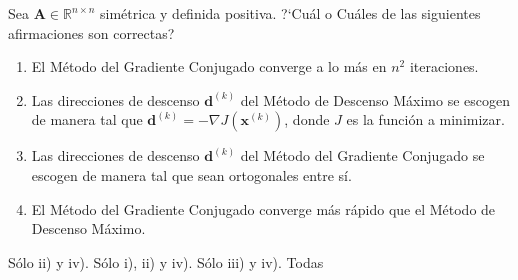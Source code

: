 \begin{pregunta}
\begin{cuerpo}
Sea $\boldsymbol{A}\in\mathbb{R}^{n\times n}$ sim\'etrica y definida positiva.
?`Cu\'al o Cu\'ales de las siguientes afirmaciones son correctas?
\begin{enumerate}
\item[i)] El M\'etodo del Gradiente Conjugado converge a lo m\'as en $n^2$ iteraciones.
\item[ii)] Las direcciones de descenso $\boldsymbol{d}^{(k)}$ del M\'etodo de Descenso M\'aximo se escogen de manera tal que  $\boldsymbol{d}^{(k)}=-\nabla J(\boldsymbol{x}^{(k)})$, donde $J$ es la funci\'on a minimizar.
\item[iii)] Las direcciones de descenso $\boldsymbol{d}^{(k)}$ del M\'etodo del Gradiente Conjugado se escogen de manera tal que  sean ortogonales entre s\'i.
\item[iv)] El M\'etodo del Gradiente Conjugado converge m\'as r\'apido que el M\'etodo de Descenso M\'aximo.
\end{enumerate}
\end{cuerpo}
\begin{multicols}{2}
\begin{alternativas}
{S\'olo ii) y iv).} %
{S\'olo i), ii) y iv).}
{S\'olo iii) y iv).}
{Todas}
\end{alternativas}
\end{multicols}
\justificacion{0cm}
\end{pregunta}
